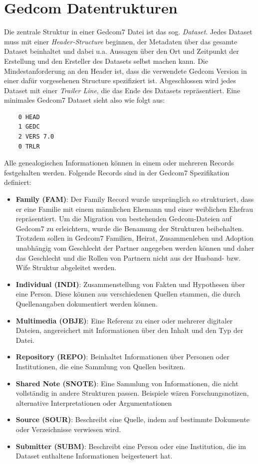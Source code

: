 \section{Gedcom Datentrukturen}
\label{sec: Konzept - Gedcom Strukturen}
Die zentrale Struktur in einer Gedcom7 Datei ist das sog. \textit{Dataset}. Jedes Dataset muss mit einer \textit{Header-Structure} beginnen, der Metadaten über das gesamte Dataset beinhaltet und dabei u.a. Aussagen über den Ort und Zeitpunkt der Erstellung und den Ersteller des Datasets selbst machen kann. Die Mindestanforderung an den Header ist, dass die verwendete Gedcom Version in einer dafür vorgesehenen Structure spezifiziert ist. Abgeschlossen wird jedes Dataset mit einer \textit{Trailer Line}, die das Ende des Datasets repräsentiert. Eine minimales Gedcom7 Dataset sieht also wie folgt aus:
\newpage
{
\begin{lstlisting}
	0 HEAD
	1 GEDC
	2 VERS 7.0
	0 TRLR
\end{lstlisting}
\label{lst: minimales dataset}
}
\vspace{1em}
Alle genealogischen Informationen können in einem oder mehreren Records festgehalten werden. Folgende Records sind in der Gedcom7 Spezifikation definiert:
\begin{itemize}
	\label{liste records}
	\item \textbf{Family (FAM)}: Der Family Record wurde ursprünglich so strukturiert, dass er eine Familie mit einem männlichen Ehemann und einer weiblichen Ehefrau repräsentiert. Um die Migration von bestehenden Gedcom-Dateien auf Gedcom7 zu erleichtern, wurde die Benamung der Strukturen beibehalten. Trotzdem sollen in Gedcom7 Familien, Heirat, Zusammenleben und Adoption unabhängig vom Geschlecht der Partner angegeben werden können und daher das Geschlecht und die Rollen von Partnern nicht aus der Husband- bzw. Wife Struktur abgeleitet werden.
	\item \textbf{Individual (INDI)}: Zusammenstellung von Fakten und Hypothesen über eine Person. Diese können aus verschiedenen Quellen stammen, die durch Quellenangaben dokumentiert werden können.
	\item \textbf{Multimedia (OBJE)}: Eine Referenz zu einer oder mehrerer digitaler Dateien, angereichert mit Informationen über den Inhalt und den Typ der Datei.
	\item \textbf{Repository (REPO)}: Beinhaltet Informationen über Personen oder Institutionen, die eine Sammlung von Quellen besitzen.
	\item \textbf{Shared Note (SNOTE)}: Eine Sammlung von Informationen, die nicht vollständig in andere Strukturen passen. Beispiele wären Forschungsnotizen, alternative Interpretationen oder Argumentationen
	\item \textbf{Source (SOUR)}: Beschreibt eine Quelle, indem auf bestimmte Dokumente oder Verzeichnisse verwiesen wird.
	\item \textbf{Submitter (SUBM)}: Beschreibt eine Person oder eine Institution, die im Dataset enthaltene Informationen beigesteuert hat.
\end{itemize}
